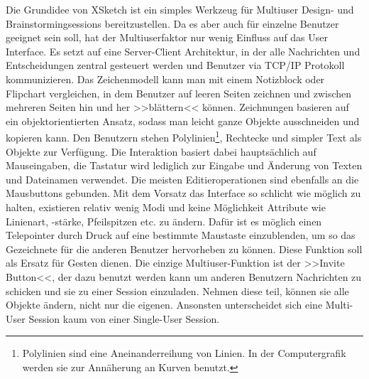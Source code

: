 Die Grundidee von XSketch ist ein simples Werkzeug für Multiuser Design- und Brainstormingsessions bereitzustellen. Da es aber auch für einzelne Benutzer geeignet sein soll, hat der Multiuserfaktor nur wenig Einfluss auf das User Interface. Es setzt auf eine Server-Client Architektur, in der alle Nachrichten und Entscheidungen zentral gesteuert werden und Benutzer via TCP/IP Protokoll kommunizieren. Das Zeichenmodell kann man mit einem Notizblock oder Flipchart vergleichen, in dem Benutzer auf leeren Seiten zeichnen und zwischen mehreren Seiten hin und her >>blättern<< können. Zeichnungen basieren auf ein objektorientierten Ansatz, sodass man leicht ganze Objekte ausschneiden und kopieren kann. Den Benutzern stehen Polylinien\footnote{Polylinien sind eine Aneinanderreihung von Linien. In der Computergrafik werden sie zur Annäherung an Kurven benutzt.}, Rechtecke und simpler Text als Objekte zur Verfügung. Die Interaktion basiert dabei hauptsächlich auf Mauseingaben, die Tastatur wird lediglich zur Eingabe und Änderung von Texten und Dateinamen verwendet. Die meisten Editieroperationen sind ebenfalls an die Mausbuttons gebunden. 
Mit dem Vorsatz das Interface so schlicht wie möglich zu halten, existieren relativ wenig Modi und keine Möglichkeit Attribute wie Linienart, -stärke, Pfeilspitzen etc. zu ändern. Dafür ist es möglich einen Telepointer durch Druck auf eine bestimmte Maustaste einzublenden, um so das Gezeichnete für die anderen Benutzer hervorheben zu können. Diese Funktion soll als Ersatz für Gesten dienen.
Die einzige Multiuser-Funktion ist der >>Invite Button<<, der dazu benutzt werden kann um anderen Benutzern Nachrichten zu schicken und sie zu einer Session einzuladen. Nehmen diese teil, können sie alle Objekte ändern, nicht nur die eigenen. Ansonsten unterscheidet sich eine Multi-User Session kaum von einer Single-User Session.

